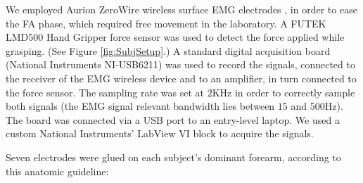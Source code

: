 \documentclass[10pt]{bmc_article}
\def\texttt{[image: ]}
\newenvironment{bmcformat}
  {\begin{raggedright}\baselineskip20pt\sloppy\setboolean{publ}{false}}
  {\end{raggedright}\baselineskip20pt\sloppy}
\begin{document}
\begin{bmcformat}

We employed Aurion ZeroWire wireless surface EMG
electrodes \cite{zerowire}, in order to ease the FA
phase, which required free movement in the laboratory. A FUTEK LMD500
Hand Gripper force sensor \cite{LMD500} was used to detect the
force applied while grasping. (See Figure \ref{fig:SubjSetup}.)
A standard digital acquisition board
(National Instruments NI-USB6211) was used to record the signals,
connected to the receiver of the EMG wireless device and to an
amplifier, in turn connected to the force sensor. The sampling rate was set at
$2$KHz in order to correctly sample both signals (the EMG signal
relevant bandwidth lies between $15$ and $500$Hz). The board was connected via a
USB port to an entry-level laptop. We used a custom National
Instruments' LabView VI block to acquire the signals.


Seven electrodes were glued on each subject's dominant
forearm, according to this anatomic guideline:

\begin{itemize}


\end{itemize}
\end{bmcformat}
\end{document}
